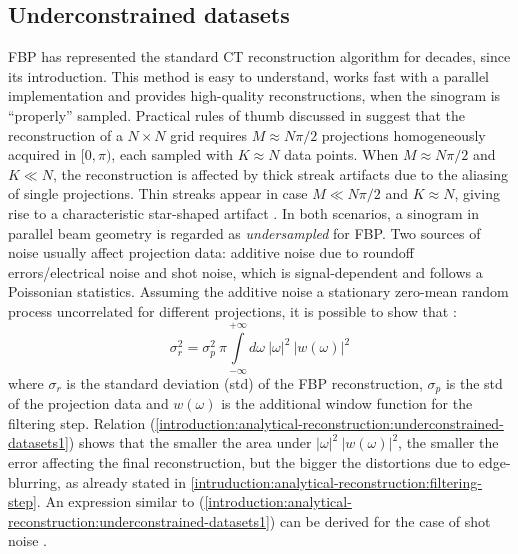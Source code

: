 {\subsection{Underconstrained datasets}
\label{introduction:underconstrained-datasets}
FBP has represented the standard CT reconstruction algorithm for decades, since its introduction.
This method is easy to understand, works fast with a parallel implementation and provides high-quality
reconstructions,
when the sinogram is ``properly'' sampled.
\newline
Practical rules of thumb discussed in \cite{Kak2001} suggest that the reconstruction of a $N\times N$ grid
requires $M \approx N \pi / 2$ projections homogeneously acquired in $[0,\pi)$, each sampled with $K \approx N$ data points.
When $M \approx N \pi / 2$ and $K \ll N$, the reconstruction is affected by thick streak artifacts due to the aliasing of single projections.
Thin streaks appear in case $M \ll N \pi / 2$ and $K \approx N$, giving rise to a characteristic star-shaped artifact \cite{Kak2001}.
In both scenarios, a sinogram in parallel beam geometry is regarded as \emph{undersampled} for FBP. 
\newline
Two sources of noise usually affect projection data: additive noise due to roundoff errors/electrical noise and shot noise, 
which is signal-dependent and follows a Poissonian statistics. Assuming the additive noise a stationary zero-mean random process
uncorrelated for different projections, it is possible to show that \cite{Kak2001}:
\begin{equation}
  \sigma_{r}^{2} = \sigma_{p}^{2}\:\pi\int\limits_{-\infty}^{+\infty} d\omega \: |\omega|^{2} \: |w(\omega)|^{2}
  \label{introduction:analytical-reconstruction:underconstrained-datasets1}
\end{equation}
where $\sigma_{r}$ is the standard deviation (std) of the FBP reconstruction, $\sigma_{p}$ is the std of the projection data
and $w(\omega)$ is the additional window function for the filtering step. 
Relation (\ref{introduction:analytical-reconstruction:underconstrained-datasets1}) shows that the smaller the area under 
$|\omega|^{2} \: |w(\omega)|^{2}$, the smaller the error affecting the final reconstruction, but the bigger the distortions
due to edge-blurring, as already stated in \ref{intruduction:analytical-reconstruction:filtering-step}. An expression
similar to (\ref{introduction:analytical-reconstruction:underconstrained-datasets1}) can be derived for the case of shot noise
\cite{Kak2001}.
\newline
}
